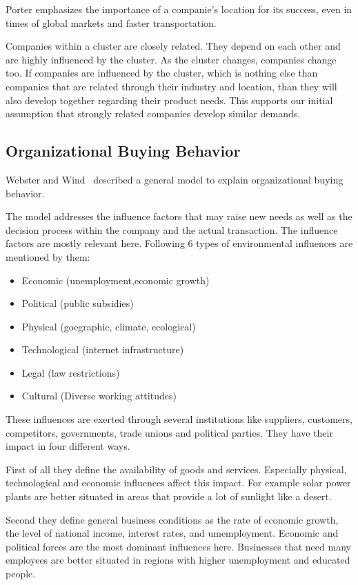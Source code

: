 Porter emphasizes the importance of a companie's location for its success, even in times of global markets and faster
transportation.

Companies within a cluster are closely related. They depend on each other and are highly influenced by the cluster.
As the cluster changes, companies change too. If companies are influenced by the cluster, which is nothing else
than companies that are related through their industry and location, than they will also develop together regarding
their product needs. This supports our initial assumption that strongly related companies develop similar demands.

\subsection{Organizational Buying Behavior}
Webster and Wind~\cite{BusinessBuyingBehavior} described a general model to explain organizational buying behavior.

The model addresses the influence factors that may raise new needs as well as the
decision process within the company and the actual transaction. The influence factors are mostly relevant
here. Following 6 types of environmental influences are mentioned by them:

\begin{itemize}
  \item Economic (unemployment,economic growth)
  \item Political (public subsidies)
  \item Physical (goegraphic, climate, ecological)
  \item Technological (internet infrastructure)
  \item Legal (law restrictions)
  \item Cultural (Diverse working attitudes)
\end{itemize}

These influences are exerted through several institutions like suppliers, customers, competitors,
governments, trade unions and political parties. They have their impact in four different ways.

First of all they define the availability of goods and services. Especially physical, technological and economic
influences affect this impact. For example solar power plants are better situated in areas that provide a lot of sunlight
like a desert.

Second they define general business conditions as the rate of economic growth, the level of national income,
interest rates, and umemployment. Economic and political forces are the most dominant influences here. Businesses that
need many employees are better situated in regions with higher unemployment and educated people.

